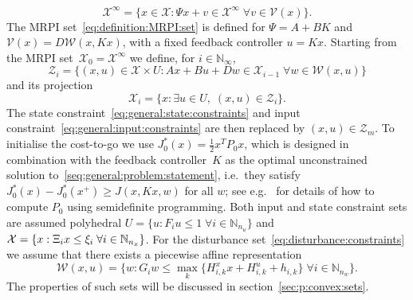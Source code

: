 \documentclass[journal]{IEEEtran}
\theoremstyle{remark}
\theoremstyle{definition}
\begin{document}
%
\begin{equation}\label{eq:definition:MRPI:set}
\mathcal X^\infty = \{x\in\mathcal X: \Psi x + v \in\mathcal X^\infty\;\forall v\in\mathcal V(x)\}.
\end{equation}
%
The MRPI set~\eqref{eq:definition:MRPI:set} is defined for $\Psi=A+BK$ and $\mathcal V(x) = D\mathcal W(x,Kx)$,
with a fixed feedback controller $u = Kx$.
%
Starting from the MRPI set~$\mathcal X_0=\mathcal X^\infty$ we define, for $i\in\mathbb N_\infty$,
%
\begin{equation}\label{eq:stage:constraints:in:x:and:u}
  \mathcal Z_i = \{(x,u)\in\mathcal X\times U: Ax + Bu + Dw \in\mathcal X_{i-1}\;\forall w\in\mathcal W(x,u)\}
\end{equation}
%
and its projection
%
\begin{equation}
  \mathcal X_i = \{x:\exists u\in U, \; (x,u)\in\mathcal Z_i\}.
\end{equation}
%
The state constraint~\eqref{eq:general:state:constraints} and input constraint~\eqref{eq:general:input:constraints}
are then replaced by $(x,u)\in\mathcal Z_m$.
%
To initialise the cost-to-go we use $J_0^\ast(x) = \frac{1}{2}x^T P_0x$, which is designed in combination with the feedback 
controller~$K$ as the optimal unconstrained solution to~\eqref{seq:general:problem:statement}, i.e.\ they satisfy
$J_0^\ast(x) - J_0^\ast(x^+)\geq J(x,Kx,w)$ for all $w$; see e.g.~\cite{Boyd:94} for details of how to compute $P_0$ using semidefinite programming.
%
Both input and state constraint sets are assumed polyhedral $U=\{u:F_iu\leq1\; \forall i\in\mathbb N_{n_u}\}$ and $\mathcal X = 
\{x:\Xi_i x\leq \xi_i\; \forall i\in\mathbb N_{n_x}\}$.
%
For the disturbance set~\eqref{eq:disturbance:constraints} we assume that there exists a piecewise affine representation
%
\begin{equation}\label{eq:definition:disturbance:set:explicit}
  \mathcal W(x,u) = \bigl\{w:G_i w\leq\max_{k}\{H_{i,k}^x x + H_{i,k}^u + h_{i,k}\}\; \forall i\in\mathbb N_{n_w}\bigr\}.
\end{equation}
%
The properties of such sets will be discussed in section~\ref{sec:p:convex:sets}.
%
%
%
%
\end{document}
